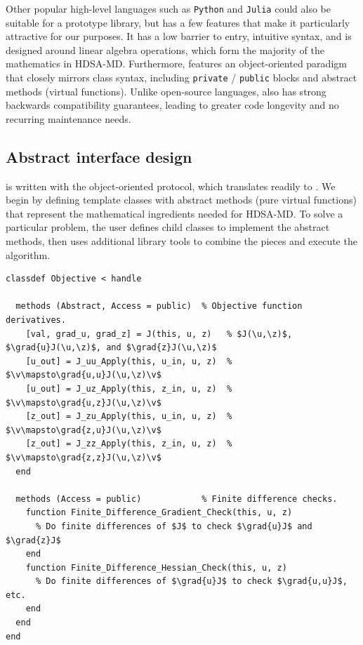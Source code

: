 \begin{remark}
Other popular high-level languages such as \texttt{Python} and \texttt{Julia} could also be suitable for a prototype library, but \MATLAB has a few features that make it particularly attractive for our purposes.
It has a low barrier to entry, intuitive syntax, and is designed around linear algebra operations, which form the majority of the mathematics in HDSA-MD.
Furthermore, \MATLAB features an object-oriented paradigm that closely mirrors \cpp class syntax, including \texttt{private} / \texttt{public} blocks and abstract methods (virtual functions).
Unlike open-source languages, \MATLAB also has strong backwards compatibility guarantees, leading to greater code longevity and no recurring maintenance needs.
\end{remark}

\subsection{Abstract interface design}

\noindent
\SABL is written with the object-oriented \MATLAB protocol, which translates readily to \cpp.
We begin by defining template classes with abstract methods (pure virtual functions) that represent the mathematical ingredients needed for HDSA-MD.
To solve a particular problem, the user defines child classes to implement the abstract methods, then uses additional library tools to combine the pieces and execute the algorithm.

\begin{listing}[t]
\begin{verbatim}
classdef Objective < handle

  methods (Abstract, Access = public)  % Objective function derivatives.
    [val, grad_u, grad_z] = J(this, u, z)   % $J(\u,\z)$, $\grad{u}J(\u,\z)$, and $\grad{z}J(\u,\z)$
    [u_out] = J_uu_Apply(this, u_in, u, z)  % $\v\mapsto\grad{u,u}J(\u,\z)\v$
    [u_out] = J_uz_Apply(this, z_in, u, z)  % $\v\mapsto\grad{u,z}J(\u,\z)\v$
    [z_out] = J_zu_Apply(this, u_in, u, z)  % $\v\mapsto\grad{z,u}J(\u,\z)\v$
    [z_out] = J_zz_Apply(this, z_in, u, z)  % $\v\mapsto\grad{z,z}J(\u,\z)\v$
  end

  methods (Access = public)            % Finite difference checks.
    function Finite_Difference_Gradient_Check(this, u, z)
      % Do finite differences of $J$ to check $\grad{u}J$ and $\grad{z}J$
    end
    function Finite_Difference_Hessian_Check(this, u, z)
      % Do finite differences of $\grad{u}J$ to check $\grad{u,u}J$, etc.
    end
  end
end
\end{verbatim}
\caption{Outline of the \MATLAB class for objective functions $J(\u,\z)$ in \SABL.}
\label{code:sabl-optimization}
\end{listing}

